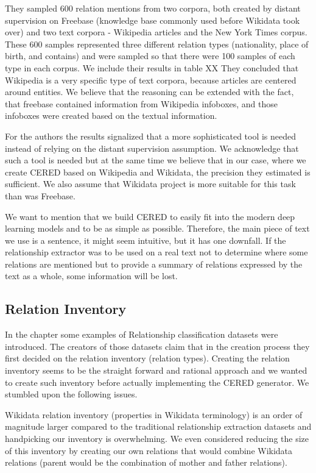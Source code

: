 They sampled 600 relation mentions from two corpora, both created by distant supervision on Freebase (knowledge base commonly used before Wikidata took over) and two text corpora - Wikipedia articles and the New York Times corpus. These 600 samples represented three different relation types (nationality, place of birth, and contains) and were sampled so that there were 100 samples of each type in each corpus. We include their results in table XX  They concluded that Wikipedia is a very specific type of text corpora, because articles are centered around entities. We believe that the reasoning can be extended with the fact, that freebase contained information from Wikipedia infoboxes, and those infoboxes were created based on the textual information. 

For the authors the results signalized that a more sophisticated tool is needed instead of relying on the distant supervision assumption. We acknowledge that such a tool is needed but at the same time we believe that in our case, where we create CERED based on Wikipedia and Wikidata, the precision they estimated is sufficient. We also assume that Wikidata project is more suitable for this task than was Freebase.

We want to mention that we build CERED to easily fit into the modern deep learning models and to be as simple as possible. Therefore, the main piece of text we use is a sentence, it might seem intuitive, but it has one downfall. If the relationship extractor was to be used on a real text not to determine where some relations are mentioned but to provide a summary of relations expressed by the text as a whole, some information will be lost. 

\subsection{Relation Inventory}
In the  chapter some examples of Relationship classification datasets were introduced. The creators of those datasets claim that in the creation process they first decided on the relation inventory (relation types).  Creating the relation inventory seems to be the straight forward and rational approach and we wanted to create such inventory before actually implementing the CERED generator. We stumbled upon the following issues.

Wikidata relation inventory (properties in Wikidata terminology) is an order of magnitude larger compared to the traditional relationship extraction datasets and handpicking our inventory is overwhelming. We even considered reducing the size of this inventory by creating our own relations that would combine Wikidata relations (parent would be the combination of mother and father relations). 

